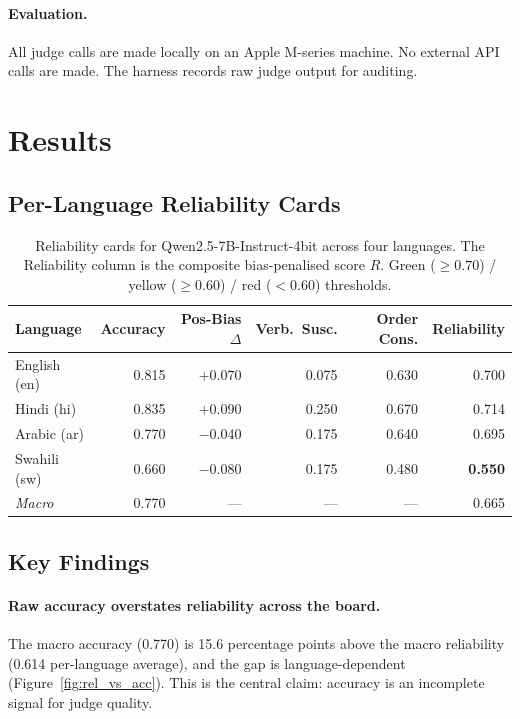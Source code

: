 \documentclass[11pt]{article}
\begin{document}
\paragraph{Evaluation.} All judge calls are made locally on an Apple M-series machine. No external API calls are made. The harness records raw judge output for auditing.

\section{Results}
\label{sec:results}

\subsection{Per-Language Reliability Cards}

\begin{table}[h]
\centering
\small
\caption{Reliability cards for Qwen2.5-7B-Instruct-4bit across four languages. The Reliability column is the composite bias-penalised score $R$. Green ($\geq 0.70$) / yellow ($\geq 0.60$) / red ($< 0.60$) thresholds.}
\label{tab:results}
\begin{tabular}{lrrrrr}
\toprule
\textbf{Language} & \textbf{Accuracy} & \textbf{Pos-Bias $\Delta$} & \textbf{Verb.\ Susc.} & \textbf{Order Cons.} & \textbf{Reliability} \\
\midrule
English (en)  & 0.815 & $+0.070$ & 0.075 & 0.630 & 0.700 \\
Hindi (hi)    & 0.835 & $+0.090$ & 0.250 & 0.670 & 0.714 \\
Arabic (ar)   & 0.770 & $-0.040$ & 0.175 & 0.640 & 0.695 \\
Swahili (sw)  & 0.660 & $-0.080$ & 0.175 & 0.480 & \textbf{0.550} \\
\midrule
\textit{Macro} & 0.770 & — & — & — & 0.665 \\
\bottomrule
\end{tabular}
\end{table}

\subsection{Key Findings}

\paragraph{Raw accuracy overstates reliability across the board.}
The macro accuracy (0.770) is 15.6 percentage points above the macro reliability (0.614 per-language average), and the gap is language-dependent (Figure~\ref{fig:rel_vs_acc}). This is the central claim: accuracy is an incomplete signal for judge quality.
\end{document}

